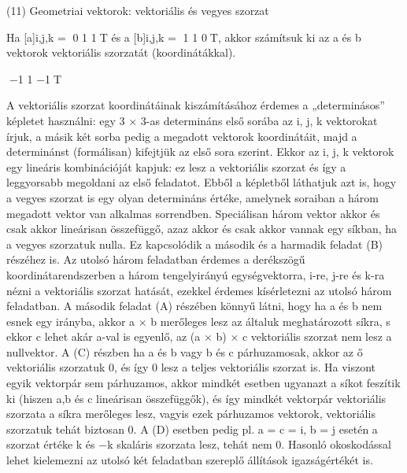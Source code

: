 \begin{frame}[plain]
\begin{tcolorbox}[center, colback={myyellow}, coltext={black}, colframe={myyellow}]
    {\RHuge  (11) Geometriai vektorok: vektoriális és vegyes szorzat }
    \mmedskip
\end{tcolorbox}
\end{frame}

\begin{frame}
  \begin{tcolorbox}[title={11/1. -N-}]
    Ha [a]i,j,k = 0 1 1T és a [b]i,j,k = 1 1 0T, akkor számítsuk ki az a és b vektorok vektoriális szorzatát (koordinátákkal).

  \tcblower

    \mmedskip 
    
    −1 1 −1T
  \end{tcolorbox}
\end{frame}


\begin{frame}
  \begin{tcolorbox}[title={11/1. -N-}]
    A vektoriális szorzat koordinátáinak kiszámításához érdemes a „determinásos” képletet használni: egy 3 × 3-as determináns első sorába az i, j, k vektorokat írjuk, a másik két sorba pedig a megadott vektorok koordinátáit, majd a determinánst (formálisan) kifejtjük az első sora szerint. Ekkor az i, j, k vektorok egy lineáris kombinációját kapjuk: ez lesz a vektoriális szorzat és így a leggyorsabb megoldani az első feladatot. Ebből a képletből láthatjuk azt is, hogy a vegyes szorzat is egy olyan determináns értéke, amelynek soraiban a három megadott vektor van alkalmas sorrendben. Speciálisan három vektor akkor és csak akkor lineárisan összefüggő, azaz akkor és csak akkor vannak egy síkban, ha a vegyes szorzatuk nulla. Ez kapcsolódik a második és a harmadik feladat (B) részéhez is. Az utolsó három feladatban érdemes a derékszögű koordinátarendszerben a három tengelyirányú egységvektorra, i-re, j-re és k-ra nézni a vektoriális szorzat hatását, ezekkel érdemes kísérletezni az utolsó három feladatban. A második feladat (A) részében könnyű látni, hogy ha a és b nem esnek egy irányba, akkor a × b merőleges lesz az általuk meghatározott síkra, s ekkor c lehet akár a-val is egyenlő, az (a × b) × c vektoriális szorzat nem lesz a nullvektor. A (C) részben ha a és b vagy b és c párhuzamosak, akkor az ő vektoriális szorzatuk 0, és így 0 lesz a teljes vektoriális szorzat is. Ha viszont egyik vektorpár sem párhuzamos, akkor mindkét esetben ugyanazt a síkot feszítik ki (hiszen a,b és c lineárisan összefüggők), és így mindkét vektorpár vektoriális szorzata a síkra merőleges lesz, vagyis ezek párhuzamos vektorok, vektoriális szorzatuk tehát biztosan 0. A (D) esetben pedig pl. a = c = i, b = j esetén a szorzat értéke k és −k skaláris szorzata lesz, tehát nem 0. Hasonló okoskodással lehet kielemezni az utolsó két feladatban szereplő állítások igazságértékét is.
  \end{tcolorbox}
\end{frame}



